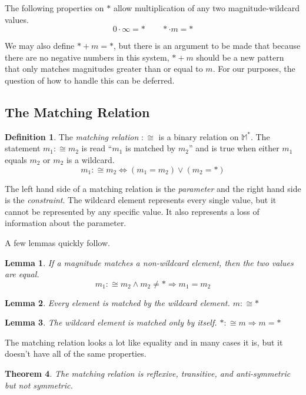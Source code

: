 \documentclass[twoside]{article}
\theoremstyle{plain}%
\newtheorem{theorem}{Theorem}[section]
\newtheorem{lemma}[theorem]{Lemma}
\theoremstyle{definition}
\newtheorem{definition}{Definition}[section]
\theoremstyle{remark}
\begin{document}
The following properties on \(\ast\) allow multiplication of any two magnitude-wildcard values.
\[0 \cdot \infty = \ast \qquad \ast \cdot m = \ast\]

We may also define \(\ast + m = \ast\), but there is an argument to  be made that because there are no negative numbers in this system, \(\ast + m\) should be a new pattern that only matches magnitudes greater than or equal to \(m\). For our purposes, the question of how to handle this can be deferred.

\subsection{The Matching Relation}

\begin{definition}
The \textit{matching relation} \(:\cong\) is a binary relation on \(\mathbb{M}^*\). The statement \(m_1 :\cong m_2\) is read ``\(m_1\) is matched by \(m_2\)'' and is true when either \(m_1\) equals \(m_2\) or \(m_2\) is a wildcard.
\[m_1 :\cong m_2 \Longleftrightarrow (m_1 = m_2) \vee (m_2 = \ast)\]
\end{definition}

The left hand side of a matching relation is the \textit{parameter} and the right hand side is the \textit{constraint}. The wildcard element represents every single value, but it cannot be represented by any specific value. It also represents a loss of information about the parameter.

A few lemmas quickly follow.

\begin{lemma}
\label{wild_prop_1} If a magnitude matches a non-wildcard element, then the two values are equal. \[m_1 :\cong m_2 \wedge m_2 \neq \ast \Longrightarrow m_1 = m_2\]
\end{lemma}

\begin{lemma}
\label{wild_prop_2}
Every element is matched by the wildcard element. \(m :\cong \ast\)
\end{lemma}

\begin{lemma}
\label{wild_prop_3}
The wildcard element is matched only by itself. \(\ast :\cong m \Longrightarrow m = \ast\)
\end{lemma}

The matching relation looks a lot like equality and in many cases it is, but it doesn't have all of the same properties.

\begin{theorem}
The matching relation is reflexive, transitive, and anti-symmetric but not symmetric.
\end{theorem}
\end{document}
